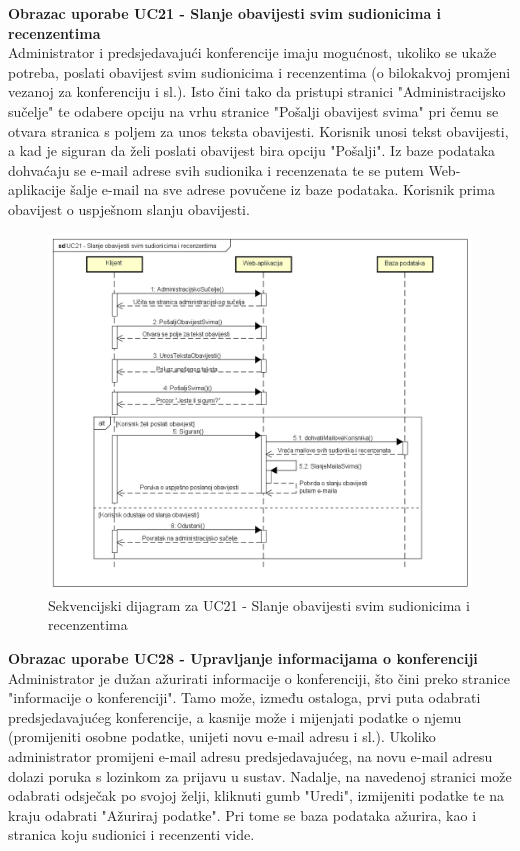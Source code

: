 				\eject


				\textbf{Obrazac uporabe UC21 - Slanje obavijesti svim sudionicima i recenzentima}\\
				Administrator i predsjedavajući konferencije imaju mogućnost, ukoliko se ukaže potreba, poslati obavijest svim sudionicima i recenzentima (o bilokakvoj promjeni vezanoj za konferenciju i sl.). Isto čini tako da pristupi stranici "Administracijsko sučelje" te odabere opciju na vrhu stranice "Pošalji obavijest svima" pri čemu se otvara stranica s poljem za unos teksta obavijesti. Korisnik unosi tekst obavijesti, a kad je siguran da želi poslati obavijest bira opciju "Pošalji". Iz baze podataka dohvaćaju se e-mail adrese svih sudionika i recenzenata te se putem Web-aplikacije šalje e-mail na sve adrese povučene iz baze podataka. Korisnik prima obavijest o uspješnom slanju obavijesti.
				\eject

				\begin{figure}[H]
					\includegraphics[scale=0.50]{dijagrami/UC21-SlanjeMaila.png} 
					\centering
					\caption{Sekvencijski dijagram za UC21 - Slanje obavijesti svim sudionicima i recenzentima}
					\label{fig:sekvencijski3}
				\end{figure}

				\eject

				\textbf{Obrazac uporabe UC28 - Upravljanje informacijama o konferenciji}\\
				Administrator je dužan ažurirati informacije o konferenciji, što čini preko stranice "informacije o konferenciji". Tamo može, između ostaloga, prvi puta odabrati predsjedavajućeg konferencije, a kasnije može i mijenjati podatke o njemu (promijeniti osobne podatke, unijeti novu e-mail adresu i sl.). Ukoliko administrator promijeni e-mail adresu predsjedavajućeg, na novu e-mail adresu dolazi poruka s lozinkom za prijavu u sustav. Nadalje, na navedenoj stranici može odabrati odsječak po svojoj želji, kliknuti gumb "Uredi", izmijeniti podatke te na kraju odabrati "Ažuriraj podatke". Pri tome se baza podataka ažurira, kao i stranica koju sudionici i recenzenti vide.
				\eject

